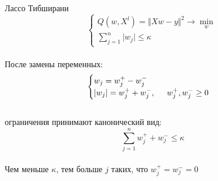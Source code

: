 \documentclass[10pt]{beamer}
\begin{document}

{
\begin{frame}{Лассо Тибширани}
	$$
	\begin{cases} Q(w,X^l) = \Vert Xw - y \Vert^2 \rightarrow \min\limits_{w} \\
	\sum_{j=1}^n \vert w_j \vert \leq \kappa
	\end{cases}
	$$\\
	\pause
	После замены переменных:\\
	$$
	\begin{cases} w_j = w_j^+ - w_j^-\\
	\vert w_j \vert = w_j^+ + w_j^-, \hspace{5mm} w_j^+, w_j^- \geq 0\\
	
	\end{cases}
	$$\\
	ограничения принимают канонический вид:\\
	$$\sum\limits_{j=1}^n w_j^+ + w_j^- \leq \kappa$$\\
	\pause
	Чем меньше $\kappa$, тем больше $j$ таких, что $w_j^+ = w_j^- = 0$\\
\end{frame}
}

\end{document}
